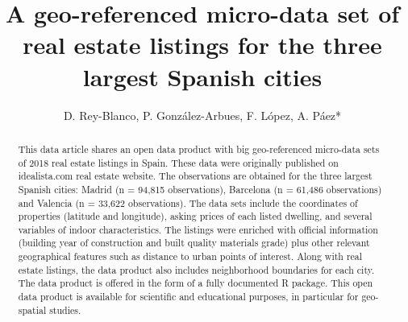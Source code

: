 \documentclass[Royal,times,sageh]{sagej}
\begin{document}

\title{A geo-referenced micro-data set of real estate listings for the
three largest Spanish cities}


\author{D. Rey-Blanco, P. González-Arbues, F.
López, A. Páez*}




\begin{abstract}
This data article shares an open data product with big geo-referenced
micro-data sets of 2018 real estate listings in Spain. These data were
originally published on idealista.com real estate website. The
observations are obtained for the three largest Spanish cities: Madrid
(n = 94,815 observations), Barcelona (n = 61,486 observations) and
Valencia (n = 33,622 observations). The data sets include the
coordinates of properties (latitude and longitude), asking prices of
each listed dwelling, and several variables of indoor characteristics.
The listings were enriched with official information (building year of
construction and built quality materials grade) plus other relevant
geographical features such as distance to urban points of interest.
Along with real estate listings, the data product also includes
neighborhood boundaries for each city. The data product is offered in
the form of a fully documented R package. This open data product is
available for scientific and educational purposes, in particular for
geo-spatial studies.
\end{abstract}


\maketitle
\end{document}
